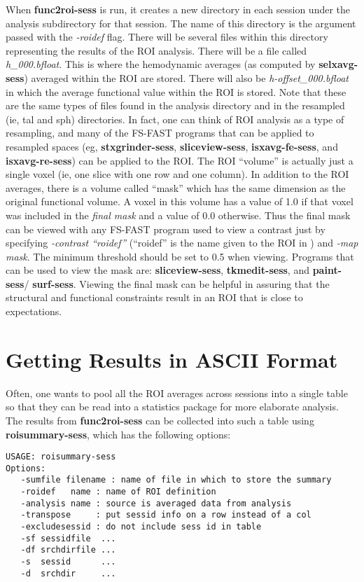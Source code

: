 \documentclass[10pt]{article}
\begin{document}
When {\bf func2roi-sess} is run, it creates a new directory in each
session under the analysis subdirectory for that session. The name of
this directory is the argument passed with the {\em -roidef}
flag. There will be several files within this directory representing
the results of the ROI analysis.  There will be a file called {\em
h\_000.bfloat}. This is where the hemodynamic averages (as computed by
{\bf selxavg-sess}) averaged within the ROI are stored. There will
also be {\em h-offset\_000.bfloat} in which the average functional
value within the ROI is stored. Note that these are the same types of
files found in the analysis directory and in the resampled (ie, tal
and sph) directories. In fact, one can think of ROI analysis as a type
of resampling, and many of the FS-FAST programs that can be applied to
resampled spaces (eg, {\bf stxgrinder-sess}, {\bf sliceview-sess},
{\bf isxavg-fe-sess}, and {\bf isxavg-re-sess}) can be applied to the
ROI. The ROI ``volume'' is actually just a single voxel (ie, one slice
with one row and one column).  In addition to the ROI averages, there
is a volume called ``mask'' which has the same dimension as the
original functional volume.  A voxel in this volume has a value of 1.0
if that voxel was included in the {\em final mask} and a value of 0.0
otherwise. Thus the final mask can be viewed with any FS-FAST program
used to view a contrast just by specifying {\em -contrast ``roidef''}
(``roidef'' is the name given to the ROI in ) and
{\em -map mask}.  The minimum threshold should be set to 0.5 when
viewing.  Programs that can be used to view the mask are: {\bf
sliceview-sess}, {\bf tkmedit-sess}, and {\bf paint-sess}/{\bf
surf-sess}. Viewing the final mask can be helpful in assuring that the
structural and functional constraints result in an ROI that is close
to expectations.

\section{Getting Results in ASCII Format}

Often, one wants to pool all the ROI averages across sessions into a
single table so that they can be read into a statistics package for
more elaborate analysis.  The results from {\bf func2roi-sess} can be
collected into such a table using {\bf roisummary-sess}, which has the
following options:

\begin{verbatim}
USAGE: roisummary-sess
Options:
   -sumfile filename : name of file in which to store the summary
   -roidef   name : name of ROI definition
   -analysis name : source is averaged data from analysis
   -transpose     : put sessid info on a row instead of a col
   -excludesessid : do not include sess id in table
   -sf sessidfile  ...
   -df srchdirfile ...
   -s  sessid      ...
   -d  srchdir     ...
\end{verbatim}
\end{document}
